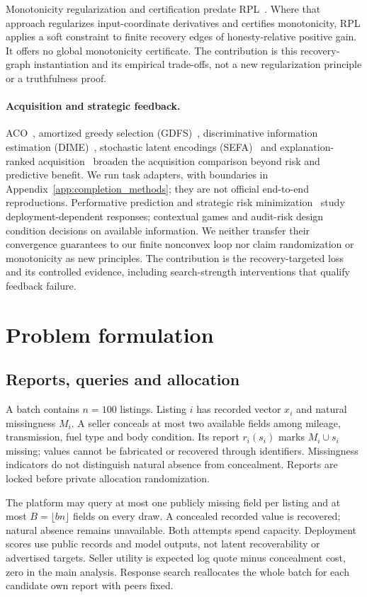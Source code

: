 \documentclass[11pt]{article}
\begin{document}
Monotonicity regularization and certification predate RPL~\cite{certmonotone}.
Where that approach regularizes input-coordinate derivatives and certifies
monotonicity, RPL applies a soft constraint to finite recovery edges of
honesty-relative positive gain. It offers no global monotonicity certificate.
The contribution is this recovery-graph instantiation and its empirical
trade-offs, not a new regularization principle or a truthfulness proof.

\paragraph{Acquisition and strategic feedback.}
ACO~\cite{activeoracle}, amortized greedy selection (GDFS)~\cite{gdfs},
discriminative information estimation (DIME)~\cite{dime}, stochastic latent
encodings (SEFA)~\cite{sefa} and explanation-ranked acquisition~\cite{explainafa}
broaden the acquisition comparison beyond risk and predictive benefit.
We run task adapters, with boundaries in Appendix~\ref{app:completion_methods};
they are not official end-to-end reproductions. Performative prediction and
strategic risk minimization~\cite{performative,serm} study deployment-dependent
responses; contextual games and audit-risk design~\cite{contextual,auditrisk}
condition decisions on available information. We neither transfer their
convergence guarantees to our finite nonconvex loop nor claim randomization
or monotonicity as new principles. The contribution is the recovery-targeted
loss and its controlled evidence, including search-strength interventions
that qualify feedback failure.

\section{Problem formulation}\label{sec:problem}
\subsection{Reports, queries and allocation}
A batch contains $n=100$ listings. Listing $i$ has recorded vector $x_i$ and
natural missingness $M_i$. A seller conceals at most two available fields
among mileage, transmission, fuel type and body condition. Its report $r_i(s_i)$
marks $M_i\cup s_i$ missing; values cannot be fabricated or recovered through
identifiers. Missingness indicators do not distinguish natural absence from
concealment. Reports are locked before private allocation randomization.

The platform may query at most one publicly missing field per listing and
at most $B=\lfloor bn\rfloor$ fields on every draw. A concealed recorded
value is recovered; natural absence remains unavailable. Both attempts spend
capacity. Deployment scores use public records and model outputs, not latent
recoverability or advertised targets. Seller utility is expected log quote
minus concealment cost, zero in the main analysis. Response search reallocates
the whole batch for each candidate own report with peers fixed.
\end{document}
